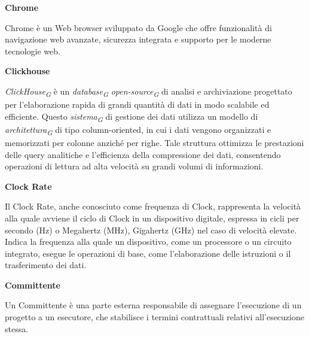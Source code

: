 \documentclass{article}
\begin{document}
\vspace{0.4cm}

\textbf{Chrome}

\vspace{0.1cm}

Chrome è un Web browser sviluppato da Google che offre funzionalità di navigazione web avanzate, sicurezza integrata e supporto per le moderne tecnologie web.

\vspace{0.4cm}

\textbf{Clickhouse}

\vspace{0.1cm}

\textit{ClickHouse}\textsubscript{\textit{G}} è un \textit{database}\textsubscript{\textit{G}} \textit{open-source}\textsubscript{\textit{G}} di analisi e archiviazione progettato per l'elaborazione rapida di grandi quantità di dati in modo scalabile ed efficiente. Questo \textit{sistema}\textsubscript{\textit{G}} di gestione dei dati utilizza un modello di \textit{architettura}\textsubscript{\textit{G}} di tipo column-oriented, in cui i dati vengono organizzati e memorizzati per colonne anziché per righe. Tale struttura ottimizza le prestazioni delle query analitiche e l'efficienza della compressione dei dati, consentendo operazioni di lettura ad alta velocità su grandi volumi di informazioni. 

\vspace{0.4cm}

\textbf{Clock Rate}

\vspace{0.1cm}

Il Clock Rate, anche conosciuto come frequenza di Clock, rappresenta la velocità alla quale avviene il ciclo di Clock in un dispositivo digitale, espressa in cicli per secondo (Hz) o Megahertz (MHz), Gigahertz (GHz) nel caso di velocità elevate. Indica la frequenza alla quale un dispositivo, come un processore o un circuito integrato, esegue le operazioni di base, come l'elaborazione delle istruzioni o il trasferimento dei dati. 

\vspace{0.4cm}

\textbf{Committente}

\vspace{0.1cm}

Un Committente è una parte esterna responsabile di assegnare l'esecuzione di un progetto a un esecutore, che stabilisce i termini contrattuali relativi all'esecuzione stessa.
\end{document}
